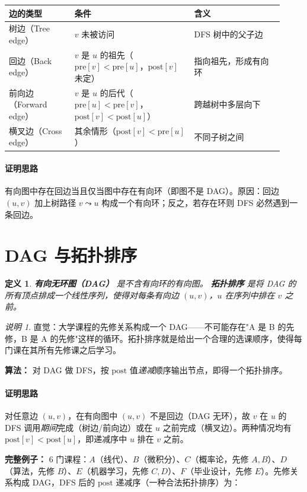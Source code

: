 \documentclass[UTF8,openany,12pt]{ctexbook}
\newtheorem{definition}{定义}[chapter]
\theoremstyle{remark}
\newtheorem{remark}{说明}[chapter]
\newcommand{\proofidea}[1]{\paragraph{证明思路}#1}
\begin{document}
\begin{center}
\small
\begin{tabular}{@{}p{0.22\linewidth}p{0.40\linewidth}p{0.30\linewidth}@{}}
\toprule
边的类型 & 条件 & 含义 \\
\midrule
树边（Tree edge）      & $v$ 未被访问 & DFS 树中的父子边 \\
回边（Back edge）      & $v$ 是 $u$ 的祖先（$\mathrm{pre}[v] < \mathrm{pre}[u]$，$\mathrm{post}[v]$ 未定） & 指向祖先，形成有向环 \\
前向边（Forward edge） & $v$ 是 $u$ 的后代（$\mathrm{pre}[u] < \mathrm{pre}[v]$，$\mathrm{post}[v] < \mathrm{post}[u]$） & 跨越树中多层向下 \\
横叉边（Cross edge）   & 其余情形（$\mathrm{post}[v] < \mathrm{pre}[u]$） & 不同子树之间 \\
\bottomrule
\end{tabular}
\end{center}

\proofidea{有向图中存在回边当且仅当图中存在有向环（即图不是 DAG）。原因：回边 $(u,v)$ 加上树路径 $v \leadsto u$ 构成一个有向环；反之，若存在环则 DFS 必然遇到一条回边。}

\section{DAG 与拓扑排序}

\begin{definition}
\textbf{有向无环图（DAG）} 是不含有向环的有向图。
\textbf{拓扑排序} 是将 DAG 的所有顶点排成一个线性序列，使得对每条有向边 $(u,v)$，$u$ 在序列中排在 $v$ 之前。
\end{definition}

\begin{remark}
直觉：大学课程的先修关系构成一个 DAG——不可能存在"A 是 B 的先修，B 是 A 的先修"这样的循环。拓扑排序就是给出一个合理的选课顺序，使得每门课在其所有先修课之后学习。
\end{remark}

\textbf{算法：} 对 DAG 做 DFS，按 $\mathrm{post}$ 值\emph{递减}顺序输出节点，即得一个拓扑排序。

\proofidea{对任意边 $(u,v)$，在有向图中 $(u,v)$ 不是回边（DAG 无环），故 $v$ 在 $u$ 的 DFS 调用\emph{期间}完成（树边/前向边）或在 $u$ 之前完成（横叉边）。两种情况均有 $\mathrm{post}[v] < \mathrm{post}[u]$，即递减序中 $u$ 排在 $v$ 之前。}

\textbf{完整例子：} 6 门课程：$A$（线代）、$B$（微积分）、$C$（概率论，先修 $A,B$）、$D$（算法，先修 $B$）、$E$（机器学习，先修 $C,D$）、$F$（毕业设计，先修 $E$）。先修关系构成 DAG，DFS 后的 $\mathrm{post}$ 递减序（一种合法拓扑排序）为：
\end{document}
